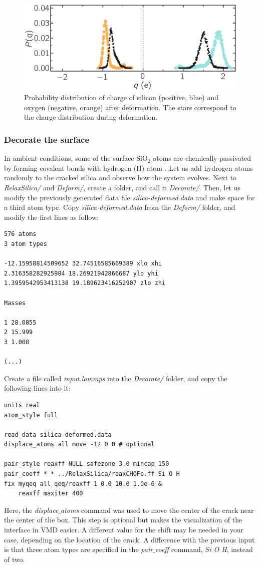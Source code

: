 \documentclass[9pt,tutorial]{livecoms}
\begin{document}
\begin{figure}
\includegraphics[width=\linewidth]{SIO-distribution-bis}
\caption{Probability distribution of charge of silicon (positive, blue) and oxygen (negative, orange) after deformation. The stars correspond to the charge distribution during deformation.}
\label{fig:SIO-distribution-bis}
\end{figure}

\subsubsection{Decorate the surface}
In ambient conditions, some of the surface $\text{SiO}_2$ atoms are chemically
passivated by forming covalent bonds with hydrogen (H) atom \cite{sulpizi2012silica}. Let us add hydrogen atoms randomly to the cracked silica and observe how the system evolves.  Next to \textit{RelaxSilica/} and \textit{Deform/}, create a folder, and call it \textit{Decorate/}. Then, let us modify the previously generated data file \textit{silica-deformed.data} and make space for a third atom type. Copy \textit{silica-deformed.data} from the \textit{Deform/} folder, and modify the first lines as follow:
{\normalsize \begin{verbatim}
576 atoms
3 atom types

-12.15958814509652 32.74516585669389 xlo xhi
2.316358282925984 18.26921942866687 ylo yhi
1.3959542953413138 19.189623416252907 zlo zhi

Masses

1 28.0855
2 15.999
3 1.008

(...)
\end{verbatim}}
Create a file called \textit{input.lammps} into the \textit{Decorate/} folder, and copy the following lines into it:
{\normalsize \begin{verbatim}
units real
atom_style full

read_data silica-deformed.data
displace_atoms all move -12 0 0 # optional

pair_style reaxff NULL safezone 3.0 mincap 150
pair_coeff * * ../RelaxSilica/reaxCHOFe.ff Si O H
fix myqeq all qeq/reaxff 1 0.0 10.0 1.0e-6 &
    reaxff maxiter 400
\end{verbatim}}
Here, the \textit{displace$\_$atoms} command was used to move the center of the crack near the center of the box. This step is optional but makes the visualization of the interface in VMD easier. A different value for the shift may be needed in your case, depending on the location of the crack. A difference with the previous input is that three atom types are specified
in the \textit{pair$\_$coeff} command, \textit{Si O H}, instead of two.
\end{document}
